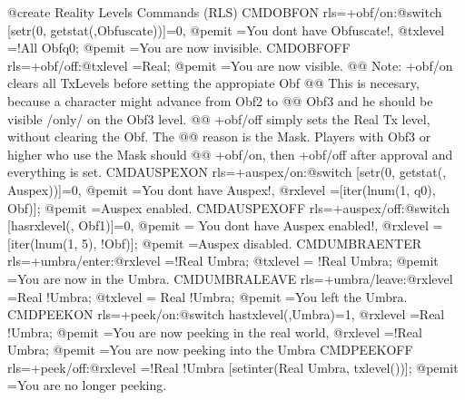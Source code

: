 \documentclass[letterpaper,10pt,english]{sphinxmanual}
\begin{document}
\begin{sphinxVerbatim}[commandchars=\\\{\}]
@create Reality Levels Commands (RLS)
\PYGZam{}CMD\PYGZus{}OBFON rls=\PYGZdl{}+obf/on:@switch [setr(0, getstat(\PYGZpc{}\PYGZsh{},Obfuscate))]=0, @pemit \PYGZpc{}\PYGZsh{}=You don\PYGZsq{}t have Obfuscate!, \PYGZob{}@txlevel \PYGZpc{}\PYGZsh{}=!All Obf\PYGZpc{}q0; @pemit \PYGZpc{}\PYGZsh{}=You are now invisible.\PYGZcb{}
\PYGZam{}CMD\PYGZus{}OBFOFF rls=\PYGZdl{}+obf/off:@txlevel \PYGZpc{}\PYGZsh{}=Real; @pemit \PYGZpc{}\PYGZsh{}=You are now visible.
@@ Note: +obf/on clears all TxLevels before setting the appropiate Obf
@@ This is necesary, because a character might advance from Obf2 to
@@ Obf3 and he should be visible /only/ on the Obf3 level.
@@ +obf/off simply sets the Real Tx level, without clearing the Obf. The
@@ reason is the Mask. Players with Obf3 or higher who use the Mask should
@@ +obf/on, then +obf/off after approval and everything is set.
\PYGZam{}CMD\PYGZus{}AUSPEXON rls=\PYGZdl{}+auspex/on:@switch [setr(0, getstat(\PYGZpc{}\PYGZsh{}, Auspex))]=0, @pemit \PYGZpc{}\PYGZsh{}=You don\PYGZsq{}t have Auspex!, \PYGZob{}@rxlevel \PYGZpc{}\PYGZsh{}=[iter(lnum(1, \PYGZpc{}q0), Obf\PYGZsh{}\PYGZsh{})]; @pemit \PYGZpc{}\PYGZsh{}=Auspex enabled.\PYGZcb{}
\PYGZam{}CMD\PYGZus{}AUSPEXOFF rls=\PYGZdl{}+auspex/off:@switch [hasrxlevel(\PYGZpc{}\PYGZsh{}, Obf1)]=0, @pemit \PYGZpc{}\PYGZsh{}= You don\PYGZsq{}t have Auspex enabled!, \PYGZob{}@rxlevel \PYGZpc{}\PYGZsh{}=[iter(lnum(1, 5), !Obf\PYGZsh{}\PYGZsh{})]; @pemit \PYGZpc{}\PYGZsh{}=Auspex disabled.\PYGZcb{}
\PYGZam{}CMD\PYGZus{}UMBRAENTER rls=\PYGZdl{}+umbra/enter:@rxlevel \PYGZpc{}\PYGZsh{}=!Real Umbra; @txlevel \PYGZpc{}\PYGZsh{}= !Real Umbra; @pemit \PYGZpc{}\PYGZsh{}=You are now in the Umbra.
\PYGZam{}CMD\PYGZus{}UMBRALEAVE rls=\PYGZdl{}+umbra/leave:@rxlevel \PYGZpc{}\PYGZsh{}=Real !Umbra; @txlevel \PYGZpc{}\PYGZsh{}= Real !Umbra; @pemit \PYGZpc{}\PYGZsh{}=You left the Umbra.
\PYGZam{}CMD\PYGZus{}PEEKON rls=\PYGZdl{}+peek/on:@switch hastxlevel(\PYGZpc{}\PYGZsh{},Umbra)=1, \PYGZob{}@rxlevel \PYGZpc{}\PYGZsh{}=Real !Umbra; @pemit \PYGZpc{}\PYGZsh{}=You are now peeking in the real world\PYGZcb{}, \PYGZob{}@rxlevel \PYGZpc{}\PYGZsh{}=!Real Umbra; @pemit \PYGZpc{}\PYGZsh{}=You are now peeking into the Umbra\PYGZcb{}
\PYGZam{}CMD\PYGZus{}PEEKOFF rls=\PYGZdl{}+peek/off:@rxlevel \PYGZpc{}\PYGZsh{}=!Real !Umbra [setinter(Real Umbra, txlevel(\PYGZpc{}\PYGZsh{}))]; @pemit \PYGZpc{}\PYGZsh{}=You are no longer peeking.
\end{sphinxVerbatim}
\end{document}
